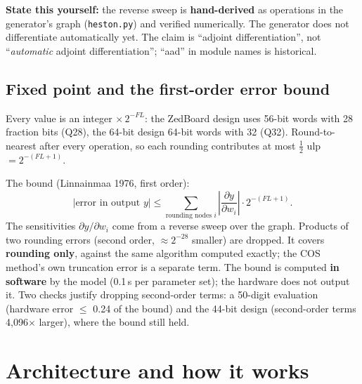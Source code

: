 \documentclass[11pt,a4paper]{article}
\begin{document}
\textbf{State this yourself:} the reverse sweep is \textbf{hand-derived} as operations in the
generator's graph (\texttt{heston.py}) and verified numerically. The generator does not
differentiate automatically yet. The claim is ``adjoint differentiation'', not
``\emph{automatic} adjoint differentiation''; ``aad'' in module names is historical.

\subsection{Fixed point and the first-order error bound}
Every value is an integer $\times\,2^{-FL}$: the ZedBoard design uses 56-bit words with 28
fraction bits (Q28), the 64-bit design 64-bit words with 32 (Q32). Round-to-nearest after
every operation, so each rounding contributes at most $\tfrac12$ ulp $= 2^{-(FL+1)}$.

The bound (Linnainmaa 1976, first order):
\[
|\text{error in output } y| \le \sum_{\text{rounding nodes } i}
\left|\frac{\partial y}{\partial w_i}\right| \cdot 2^{-(FL+1)} .
\]
The sensitivities $\partial y/\partial w_i$ come from a reverse sweep over the graph.
Products of two rounding errors (second order, $\approx 2^{-28}$ smaller) are dropped. It
covers \textbf{rounding only}, against the same algorithm computed exactly; the COS method's
own truncation error is a separate term. The bound is computed \textbf{in software} by the
model (0.1\,s per parameter set); the hardware does not output it. Two checks justify
dropping second-order terms: a 50-digit evaluation (hardware error $\le$ 0.24 of the bound)
and the 44-bit design (second-order terms 4,096$\times$ larger), where the bound still held.

\section{Architecture and how it works}
\end{document}
